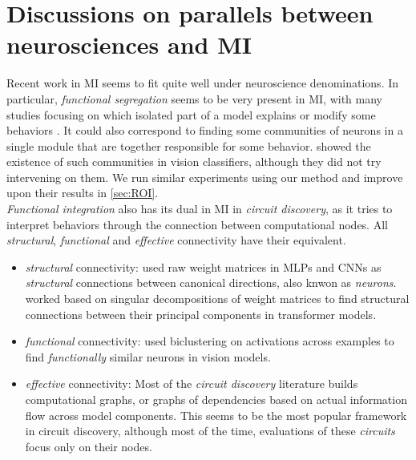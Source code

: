 \documentclass{article}
\begin{document}
\section{Discussions on parallels between neurosciences and MI}
\label{app:parallels}

Recent work in MI seems to fit quite well under neuroscience denominations. In particular, \textit{functional segregation} seems to be very present in MI, with many studies focusing on which isolated part of a model explains or modify some behaviors \citep{variengien2023lookleapuniversalemergent, burns2024discoveringlatentknowledgelanguage, panickssery2024steeringllama2contrastive}. It could also correspond to finding some communities of neurons in a single module that are together responsible for some behavior. \citet{lu2019checking} showed the existence of such communities in vision classifiers, although they did not try intervening on them. We run similar experiments using our method and improve upon their results in \cref{sec:ROI}.\\

\textit{Functional integration} also has its dual in MI in \textit{circuit discovery}, as it tries to interpret behaviors through the connection between computational nodes. All \textit{structural}, \textit{functional} and \textit{effective} connectivity have their equivalent.
\begin{itemize}
    \item \textit{structural} connectivity: \citet{filan2021clusterability} used raw weight matrices in MLPs and CNNs as \textit{structural} connections between canonical directions, also knwon as \textit{neurons}. \citet{merullo2024talking} worked based on singular decompositions of weight matrices to find structural connections between their principal components in transformer models.
    \item \textit{functional} connectivity: \citet{lu2019checking} used biclustering on activations across examples to find \textit{functionally} similar neurons in vision models.
    \item \textit{effective} connectivity: Most of the \textit{circuit discovery} literature builds computational graphs, or graphs of dependencies based on actual information flow across model components. This seems to be the most popular framework in circuit discovery, although most of the time, evaluations of these \textit{circuits} focus only on their nodes.
\end{itemize}
\end{document}
